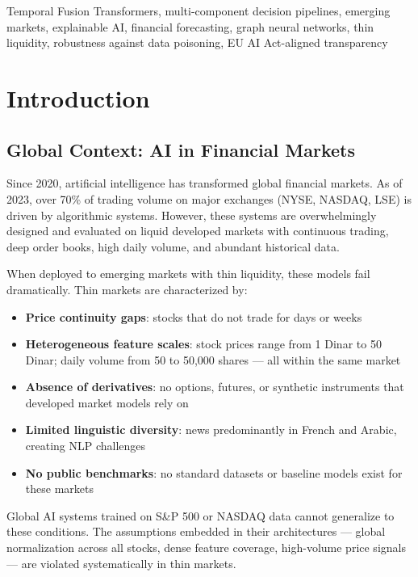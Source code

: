 \documentclass[conference]{IEEEtran}
\begin{document}
\begin{abstract}
\end{abstract}

\begin{IEEEkeywords}
Temporal Fusion Transformers, multi-component decision pipelines, emerging markets, explainable AI, financial forecasting, graph neural networks, thin liquidity, robustness against data poisoning, EU AI Act-aligned transparency
\end{IEEEkeywords}

\section{Introduction}

\subsection{Global Context: AI in Financial Markets}

Since 2020, artificial intelligence has transformed global financial markets. As of 2023, over 70\% of trading volume on major exchanges (NYSE, NASDAQ, LSE) is driven by algorithmic systems. However, these systems are overwhelmingly designed and evaluated on liquid developed markets with continuous trading, deep order books, high daily volume, and abundant historical data. 

When deployed to emerging markets with thin liquidity, these models fail dramatically. Thin markets are characterized by:
\begin{itemize}
\item \textbf{Price continuity gaps}: stocks that do not trade for days or weeks
\item \textbf{Heterogeneous feature scales}: stock prices range from 1 Dinar to 50 Dinar; daily volume from 50 to 50,000 shares — all within the same market
\item \textbf{Absence of derivatives}: no options, futures, or synthetic instruments that developed market models rely on
\item \textbf{Limited linguistic diversity}: news predominantly in French and Arabic, creating NLP challenges
\item \textbf{No public benchmarks}: no standard datasets or baseline models exist for these markets
\end{itemize}

Global AI systems trained on S\&P 500 or NASDAQ data cannot generalize to these conditions. The assumptions embedded in their architectures — global normalization across all stocks, dense feature coverage, high-volume price signals — are violated systematically in thin markets.
\end{document}
